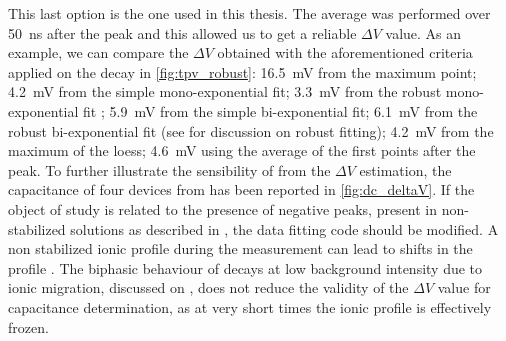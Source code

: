 	This last option is the one used in this thesis.
	The average was performed over \SI{50}{\nano\s} after the peak and this allowed us to get a reliable $\Delta V$ value.
	As an example, we can compare the $\Delta V$ obtained with the aforementioned criteria applied on the  decay in \cref{fig:tpv_robust}: \SI{16.5}{\mV} from the maximum point; \SI{4.2}{\mV} from the simple mono\hyp{}exponential fit; \SI{3.3}{\mV} from the robust mono\hyp{}exponential fit ; \SI{5.9}{\mV} from the simple bi\hyp{}exponential fit; \SI{6.1}{\mV} from the robust bi\hyp{}exponential fit (see  for discussion on robust fitting); \SI{4.2}{\mV} from the maximum of the \gls{loess}; \SI{4.6}{\mV} using the average of the first points after the peak.
	To further illustrate the sensibility of  from the $\Delta V$ estimation, the capacitance of four devices from \cite{Gelmetti2019} has been reported in \cref{fig:dc_deltaV}.
	If the object of study is related to the presence of negative peaks, present in non-stabilized solutions as described in , the data fitting code should be modified.
	A non stabilized ionic profile during the  measurement can lead to shifts in the  profile \cite{ORegan2015b}.
	The biphasic behaviour of  decays at low background intensity due to ionic migration, discussed on , does not reduce the validity of the $\Delta V$ value for capacitance determination, as at very short times the ionic profile is effectively frozen.


